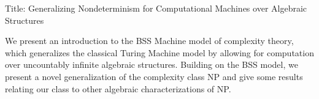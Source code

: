 
Title: Generalizing Nondeterminism for Computational Machines over Algebraic Structures

We present an introduction to the BSS Machine model of complexity
theory, which generalizes the classical Turing Machine model by
allowing for computation over uncountably infinite algebraic
structures.  Building on the BSS model, we present a novel
generalization of the complexity class NP and give some results
relating our class to other algebraic characterizations of NP.

